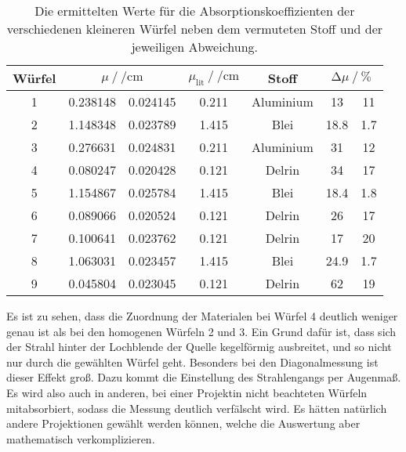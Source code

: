 \begin{table}[H]
    \centering
    \caption{Die ermittelten Werte für die Absorptionskoeffizienten der verschiedenen kleineren Würfel neben dem vermuteten Stoff und der jeweiligen Abweichung.}
    \label{tab:compare}
    \begin{tabular}{c S[table-format=1.6] @{${}\pm{}$} S[table-format=1.6] S[table-format=1.6] c S[table-format=2.1] @{${}\pm{}$} S[table-format=2.1]}
      \toprule
      {Würfel} &   & {$\mu_{\text{lit}} \mathbin{/} \si{\per\centi\metre}$} & {Stoff} &  \\
       & 0.238148 & 0.024145  & 0.211 & Aluminium  & 13    &11\\
      2 & 1.148348 & 0.023789  & 1.415 & Blei       & 18.8  & 1.7\\
      3 & 0.276631 & 0.024831  & 0.211 & Aluminium  & 31    &12\\
      4 & 0.080247 & 0.020428  & 0.121 & Delrin     & 34    &17\\
      5 & 1.154867 & 0.025784  & 1.415 & Blei       & 18.4  &1.8\\
      6 & 0.089066 & 0.020524  & 0.121 & Delrin     & 26    &17\\
      7 & 0.100641 & 0.023762  & 0.121 & Delrin     & 17    &20\\
      8 & 1.063031 & 0.023457  & 1.415 & Blei       & 24.9  &1.7\\
      9 & 0.045804 & 0.023045  & 0.121 & Delrin     & 62    &19\\
      \bottomrule
    \end{tabular}
  \end{table}

\noindent Es ist zu sehen, dass die Zuordnung der Materialen bei Würfel 4 deutlich weniger genau ist als bei den homogenen Würfeln 2 und 3. Ein Grund
dafür ist, dass sich der Strahl hinter der Lochblende der Quelle kegelförmig ausbreitet, und so nicht nur durch die gewählten Würfel geht. 
Besonders bei den Diagonalmessung ist dieser Effekt groß. Dazu kommt die Einstellung des Strahlengangs per Augenmaß. Es wird also auch in anderen, 
bei einer Projektin nicht beachteten Würfeln mitabsorbiert, sodass die Messung deutlich verfälscht wird. Es hätten natürlich andere Projektionen gewählt 
werden können, welche die Auswertung aber mathematisch verkomplizieren. 